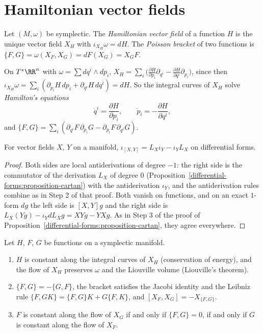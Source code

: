 \section{Hamiltonian vector fields}\label{symplectic-geometry:section-hamiltonian}

\begin{definition}\label{symplectic-geometry:definition-hamiltonian}
Let $(M, \omega)$ be symplectic. The \emph{Hamiltonian vector field} of a function $H$ is the unique vector field $X_H$ with $\iota_{X_H}\omega = dH$. The \emph{Poisson bracket} of two functions is
$\{F, G\} = \omega(X_F, X_G) = dF(X_G) = X_GF$.
\end{definition}

On $T^*\RR^n$ with $\omega = \sum dq^i \wedge dp_i$, $X_H = \sum_i\bigl(\frac{\partial H}{\partial p_i}\partial_{q^i} - \frac{\partial H}{\partial q^i}\partial_{p_i}\bigr)$, since then
$\iota_{X_H}\omega = \sum_i(\partial_{p_i}H\,dp_i + \partial_{q^i}H\,dq^i) = dH$. So the integral curves of $X_H$ solve \emph{Hamilton's equations}
\[
\dot q^i = \frac{\partial H}{\partial p_i}, \qquad \dot p_i = -\frac{\partial H}{\partial q^i},
\]
and $\{F, G\} = \sum_i(\partial_{q^i}F\,\partial_{p_i}G - \partial_{p_i}F\,\partial_{q^i}G)$.

\begin{lemma}\label{symplectic-geometry:lemma-interior-bracket}
For vector fields $X$, $Y$ on a manifold, $\iota_{[X, Y]} = L_X\iota_Y - \iota_YL_X$ on differential forms.
\end{lemma}

\begin{proof}
Both sides are local antiderivations of degree $-1$: the right side is the commutator of the derivation $L_X$ of degree $0$ (Proposition~\ref{differential-forms:proposition-cartan}) with the antiderivation
$\iota_Y$, and the antiderivation rules combine as in Step 2 of that proof. Both vanish on functions, and on an exact $1$-form $dg$ the left side is $[X, Y]g$ and the right side is
$L_X(Yg) - \iota_YdL_Xg = XYg - YXg$. As in Step 3 of the proof of Proposition~\ref{differential-forms:proposition-cartan}, they agree everywhere.
\end{proof}

\begin{proposition}\label{symplectic-geometry:proposition-hamiltonian}
Let $H$, $F$, $G$ be functions on a symplectic manifold.
\begin{enumerate}
\item $H$ is constant along the integral curves of $X_H$ (conservation of energy), and the flow of $X_H$ preserves $\omega$ and the Liouville volume (Liouville's theorem).
\item $\{F, G\} = -\{G, F\}$, the bracket satisfies the Jacobi identity and the Leibniz rule $\{F, GK\} = \{F, G\}K + G\{F, K\}$, and $[X_F, X_G] = -X_{\{F, G\}}$.
\item $F$ is constant along the flow of $X_G$ if and only if $\{F, G\} = 0$, if and only if $G$ is constant along the flow of $X_F$.
\end{enumerate}
\end{proposition}

